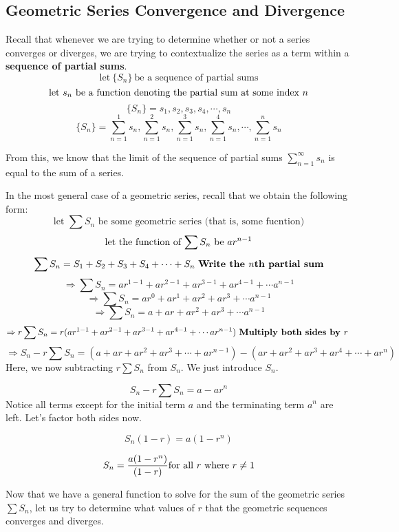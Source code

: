 \documentclass{report}
\begin{document}
\begin{sloppypar}
{{  }}


\subsection{Geometric Series Convergence and Divergence}
Recall that whenever we are trying to determine whether or not a series
converges or diverges, we are trying to contextualize the series as a
term within a \textbf{sequence of partial sums}.
\[ \textrm{let} ~ \{S_{n}\} ~ \textrm{be a sequence of partial sums}\]
\[ \textrm{let} ~ s_{n} ~ \textrm{be a function denoting the partial sum at some index $ n $}\]
\[ \{S_{n}\} = s_{1} , s_{2} , s_{3} , s_{4} , \cdots , s_{n}\]
\[ \{S_{n}\} = \sum_{n=1}^{1}s_{n} , \sum_{n=1}^{2} s_{n} ,
  \sum_{n=1}^{3} s_{n}, \sum_{n=1}^{4}s_{n}, \cdots, \sum_{n=1}^{n} s_{n}    \]

From this, we know that the limit of the sequence of partial sums $ \sum_{n=1}^{\infty}s_{n}$ is
equal to the sum of a series.

\par In the most general case of a geometric series, recall that
we obtain the following form:
\[ \textrm{let $\sum S_{n}$ be some geometric series (that is, some fucntion)}\]
\[ \textrm{let the function of $ \sum S_{n}$ be } ar^{n-1} \]
\[ \sum S_{n} = S_{1} + S_{2} + S_{3} + S_{4} + \cdots + S_{n}  \textrm{ \textbf{Write the $ n$th partial sum}}\]
\[ \Rightarrow \sum S_{n} = ar^{1-1} + ar^{2-1} + ar^{3-1} + ar^{4-1} + \cdots a^{n-1} \]
\[ \Rightarrow \sum S_{n} = ar^{0} + ar^{1} + ar^{2} + ar^{3} + \cdots a^{n-1} \]
\[ \Rightarrow \sum S_{n} = a + ar + ar^{2} + ar^{3} + \cdots a^{n-1} \]
\[ \Rightarrow
  r\sum S_{n} = r(ar^{1-1} + ar^{2-1} + ar^{3-1} + ar^{4-1} + \cdots ar^{n-1}) \textrm{ \textbf{Multiply both sides by $ r $} }\]
\[ \Rightarrow
  S_{n} - r\sum S_{n} = (a + ar + ar^{2} + ar^{3} + \cdots + ar^{n-1} ) - (ar + ar^{2} + ar^{3} + ar^{4} + \cdots + ar^{n})
\]
Here, we now subtracting $ r\sum S_{n}$ from $ S_{n} $. We just introduce $ S_{n} $.

\[ S_{n} - r\sum S_{n} = a - ar^{n}\]
Notice all terms except for the initial term $ a $ and the
terminating term $ a ^{n} $ are left. Let's factor both sides now.

\[ S_{n} (1 - r) = a (1 - r^{n}) \]

\[ S_{n} = \frac{a(1-r^{n})}{(1-r)} \textrm{for all $ r $ where $ r \neq 1 $} \]

Now that we have a general function to solve for the sum of the geometric series $ \sum S_{n} $,
let us try to determine what values of $ r $ that the geometric sequences converges and
diverges.


\end{sloppypar}
\end{document}
